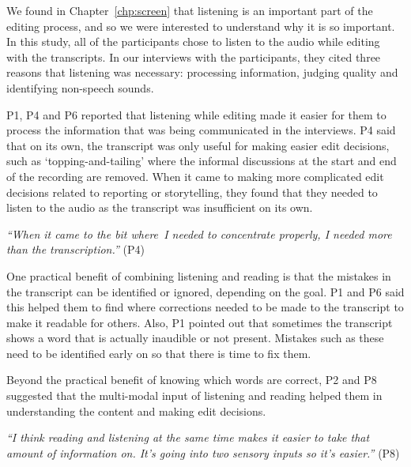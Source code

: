 We found in Chapter~\ref{chp:screen} that listening is an important part of the editing process, and so we were
interested to understand why it is so important. In this study, all of the participants chose to listen to the audio
while editing with the transcripts. In our interviews with the participants, they cited three reasons that listening
was necessary: processing information, judging quality and identifying non-speech sounds.





P1, P4 and P6 reported that listening while editing made it easier for them to process the information that was
being communicated in the interviews.  P4 said that on its own, the transcript was only useful for making easier edit
decisions, such as `topping-and-tailing' where the informal discussions at the start and end of the recording are
removed.  When it came to making more complicated edit decisions related to reporting or storytelling, they found that
they needed to listen to the audio as the transcript was insufficient on its own.

\textit{``When it came to the bit where I needed to concentrate properly, I needed more than the transcription.''} (P4)

One practical benefit of combining listening and reading is that the mistakes in the transcript can be identified or 
ignored, depending on the goal.  P1 and P6 said this helped them to find where corrections needed to be made to the
transcript to make it readable for others. Also, P1 pointed out that sometimes the transcript shows a word that is
actually inaudible or not present. Mistakes such as these need to be identified early on so that there is time to fix
them.

Beyond the practical benefit of knowing which words are correct, P2 and P8 suggested that the multi-modal input of
listening and reading helped them in understanding the content and making edit decisions.

\textit{``I think reading and listening at the same time makes it easier to take that amount of information on. It's
going into two sensory inputs so it's easier.''} (P8)

